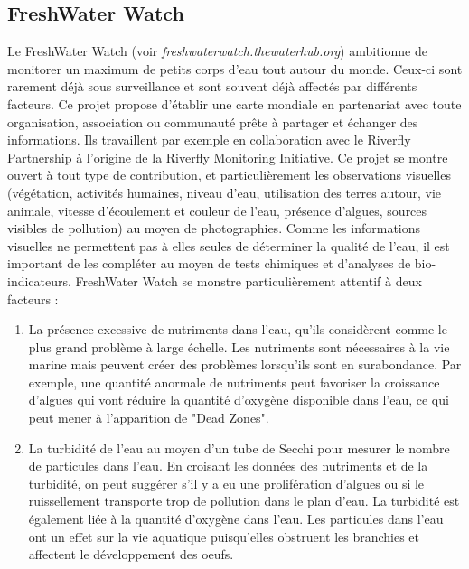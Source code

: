 \documentclass[10pt, article]{llncs}
\begin{document}
	\subsection{FreshWater Watch}
		Le FreshWater Watch (voir \textit{freshwaterwatch.thewaterhub.org}) ambitionne de monitorer un maximum de petits corps d'eau tout autour du monde. Ceux-ci sont rarement déjà sous surveillance et sont souvent déjà affectés par différents facteurs. Ce projet propose d'établir une carte mondiale en partenariat avec toute organisation, association ou communauté prête à partager et échanger des informations. Ils travaillent par exemple en collaboration avec le Riverfly Partnership à l'origine de la Riverfly Monitoring Initiative. Ce projet se montre ouvert à tout type de contribution, et particulièrement les observations visuelles (végétation, activités humaines, niveau d'eau, utilisation des terres autour, vie animale, vitesse d'écoulement et couleur de l'eau, présence d'algues, sources visibles de pollution) au moyen de photographies. Comme les informations visuelles ne permettent pas à elles seules de déterminer la qualité de l'eau, il est important de les compléter au moyen de tests chimiques et d'analyses de bio-indicateurs. FreshWater Watch se monstre particulièrement attentif à deux facteurs :
		\begin{enumerate}
			\item La présence excessive de nutriments dans l'eau, qu'ils considèrent comme le plus grand problème à large échelle. Les nutriments sont nécessaires à la vie marine mais peuvent créer des problèmes lorsqu'ils sont en surabondance. Par exemple, une quantité anormale de nutriments peut favoriser la croissance d'algues qui vont réduire la quantité d'oxygène disponible dans l'eau, ce qui peut mener à l'apparition de "Dead Zones".
			\item La turbidité de l'eau au moyen d'un tube de Secchi pour mesurer le nombre de particules dans l'eau. En croisant les données des nutriments et de la turbidité, on peut suggérer s'il y a eu une prolifération d'algues ou si le ruissellement transporte trop de pollution dans le plan d'eau. La turbidité est également liée à la quantité d'oxygène dans l'eau. Les particules dans l'eau ont un effet sur la vie aquatique puisqu'elles obstruent les branchies et affectent le développement des oeufs.
		\end{enumerate}
\end{document}
